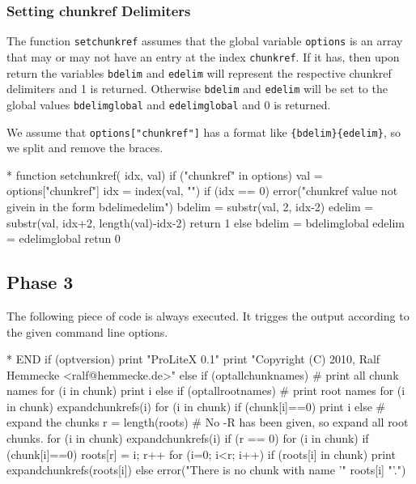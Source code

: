 \documentclass[a4paper]{article} %
\begin{document}
\subsubsection{Setting chunkref Delimiters}

The function \texttt{setchunkref} assumes that the global variable
\texttt{options} is an array that may or may not have an entry at the
index \texttt{chunkref}. If it has, then upon return the variables
\texttt{bdelim} and \texttt{edelim} will represent the respective
chunkref delimiters and 1 is returned. Otherwise \texttt{bdelim} and
\texttt{edelim} will be set to the global values \texttt{bdelimglobal}
and \texttt{edelimglobal} and 0 is returned.

We assume that \verb'options["chunkref"]' has a format like
\verb"{bdelim}{edelim}", so we split and remove the braces.
\begin{chunk}{*}
function setchunkref( idx, val) {
  if ("chunkref" in options) {
    val = options["chunkref"]
    idx = index(val, "}{")
    if (idx == 0) {
      error("chunkref value not givein in the form {bdelim}{edelim}")
    }
    bdelim = substr(val, 2, idx-2)
    edelim = substr(val, idx+2, length(val)-idx-2)
    return 1
  } else {
    bdelim = bdelimglobal
    edelim = edelimglobal
    retun 0
  }
}
\end{chunk}

\subsection{Phase 3}\label{sec:phase3}
The following piece of code is always executed. It trigges the output
according to the given command line options.

\begin{chunk}{*}
END {
  if (optversion) {
    print "ProLiteX 0.1"
    print "Copyright (C) 2010,  Ralf Hemmecke <ralf@hemmecke.de>"
  } else if (optallchunknames) { # print all chunk names
    for (i in chunk) {print i}
  } else if (optallrootnames) { # print root names
    for (i in chunk) {expandchunkrefs(i)}
    for (i in chunk) {if (chunk[i]==0) {print i}}
  } else { # expand the chunks
    r = length(roots)
    # No -R has been given, so expand all root chunks.
    for (i in chunk) {expandchunkrefs(i)}
    if (r == 0) {for (i in chunk) {if (chunk[i]==0) {roots[r] = i; r++}}}
    for (i=0; i<r; i++) {
      if (roots[i] in chunk) {print expandchunkrefs(roots[i])}
      else {error("There is no chunk with name '" roots[i] "'.")}
    }
  }
}
\end{chunk}







\end{document}
